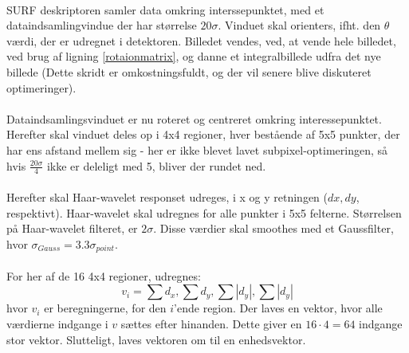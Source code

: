 \\
SURF deskriptoren samler data omkring interssepunktet, med et dataindsamlingvindue der har størrelse $20 \sigma$. Vinduet skal orienters, ifht. den $\theta$ værdi, der er udregnet i detektoren. Billedet vendes, ved, at vende hele billedet, ved brug af ligning \eqref{rotaionmatrix}, og danne et integralbillede udfra det nye billede (Dette skridt er omkostningsfuldt, og der vil senere blive diskuteret optimeringer).
\\
\\
Dataindsamlingsvinduet er nu roteret og centreret omkring interessepunktet. Herefter skal vinduet deles op i 4x4 regioner, hver bestående af 5x5 punkter, der har ens afstand mellem sig - her er ikke blevet lavet subpixel-optimeringen, så hvis $\frac{20\sigma}{4}$ ikke er deleligt med 5, bliver der rundet ned.
\\
\\
Herefter skal Haar-wavelet responset udreges, i x og y retningen ($dx, dy$, respektivt). Haar-wavelet skal udregnes for alle punkter i 5x5 felterne. Størrelsen på Haar-wavelet filteret, er $2\sigma$. Disse værdier skal smoothes med et Gaussfilter, hvor $\sigma_{Gauss} = 3.3\sigma_{point}$.
\\
\\
For her af de 16 4x4 regioner, udregnes: 
\begin{equation}
v_i = \sum d_x, \sum d_y, \sum |d_y|, \sum |d_y|
\label{surffeature}
\end{equation}
hvor $v_i$ er beregningerne, for den $i$'ende region. Der laves en vektor, hvor alle værdierne indgange i $v$ sættes efter hinanden. Dette giver en $16 \cdot 4 = 64$ indgange stor vektor. Slutteligt, laves vektoren om til en enhedsvektor.

